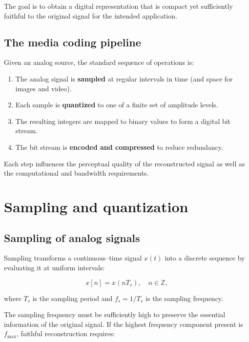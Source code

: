 \begin{center}
\end{center}

The goal is to obtain a digital representation that is compact yet sufficiently faithful to the original signal for the intended application.

\subsection{The media coding pipeline}

Given an analog source, the standard sequence of operations is:

\begin{enumerate}
\item The analog signal is \textbf{sampled} at regular intervals in time (and space for images and video).
\item Each sample is \textbf{quantized} to one of a finite set of amplitude levels.
\item The resulting integers are mapped to binary values to form a digital bit stream.
\item The bit stream is \textbf{encoded and compressed} to reduce redundancy.
\end{enumerate}

Each step influences the perceptual quality of the reconstructed signal as well as the computational and bandwidth requirements.

\section{Sampling and quantization}

\subsection{Sampling of analog signals}

Sampling transforms a continuous--time signal $x(t)$ into a discrete sequence by evaluating it at uniform intervals:

\[ x[n] = x(nT_s), \quad n \in \mathbb{Z}, \]

\noindent where $T_s$ is the sampling period and $f_s = 1/T_s$ is the sampling frequency.

The sampling frequency must be sufficiently high to preserve the essential information of the original signal. If the highest frequency component present is $f_{\max}$, faithful reconstruction requires:

